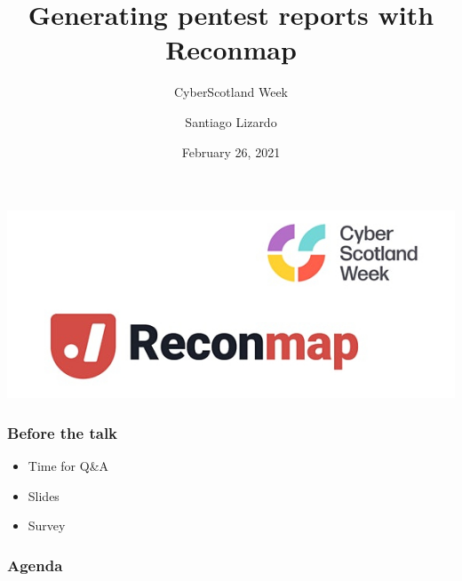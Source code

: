 \documentclass{beamer}
\title{Generating pentest reports with Reconmap}
\subtitle{CyberScotland Week}
\author[]{Santiago Lizardo}
\date{February 26, 2021}
\begin{document}
\begin{frame}
    \note[item]{
    }
    
	\includegraphics[width=\textwidth]{cyberscotland-week-reconmap.jpg}
	\maketitle
\end{frame}


\begin{frame}
    \frametitle{Before the talk}
    
    \note[item]{
    }

    \begin{itemize}
    		\item Time for Q\&A
    		\item Slides
    		\item Survey
    \end{itemize}
\end{frame}

\begin{frame}
	\frametitle{Agenda}
	
		\note[item]{
	}
	
	\tableofcontents[hideothersubsections]
\end{frame}
\end{document}
